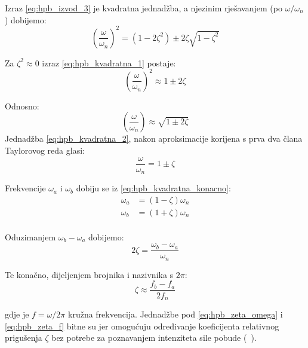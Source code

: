 Izraz \eqref{eq:hpb_izvod_3} je kvadratna jednadžba, a njezinim rješavanjem (po
$\omega/\omega_n$) dobijemo:
\begin{equation}\label{eq:hpb_kvadratna_1}
    \left(\frac{\omega}{\omega_n}\right)^2 = 
        (1-2\zeta^2)\pm 2\zeta\sqrt{1-\zeta^2}
\end{equation}

Za $\zeta^2 \approx 0$ izraz \eqref{eq:hpb_kvadratna_1} postaje:
\begin{equation}
    \left(\frac{\omega}{\omega_n}\right)^2 \approx
        1 \pm 2\zeta
\end{equation}

Odnosno:
\begin{equation}\label{eq:hpb_kvadratna_2}
    \left(\frac{\omega}{\omega_n}\right)\approx
        \sqrt{1 \pm 2\zeta}
\end{equation}
Jednadžba \eqref{eq:hpb_kvadratna_2}, nakon aproksimacije korijena s prva dva člana Taylorovog
reda glasi:
\begin{equation}\label{eq:hpb_kvadratna_konacno}
    \frac{\omega}{\omega_n} = 1 \pm \zeta
\end{equation}

Frekvencije $\omega_a$ i $\omega_b$ dobiju se iz \eqref{eq:hpb_kvadratna_konacno}:
\begin{align}
    \omega_a &= (1-\zeta)\omega_n\\
    \omega_b &= (1+\zeta)\omega_n\\
\end{align}

Oduzimanjem $\omega_b-\omega_a$ dobijemo:
\begin{equation}\label{eq:hpb_zeta_omega}
        2\zeta = \frac{\omega_b-\omega_a}{\omega_n}
\end{equation}

Te konačno, dijeljenjem brojnika i nazivnika s $2\pi$:
\begin{equation}\label{eq:hpb_zeta_f}
    \zeta\approx\frac{f_b-f_a}{2f_n}
\end{equation}

gdje je $f=\omega/2\pi$ kružna frekvencija. Jednadžbe pod \eqref{eq:hpb_zeta_omega}
i \eqref{eq:hpb_zeta_f} bitne su jer omogućuju određivanje koeficijenta relativnog prigušenja
$\zeta$ bez potrebe za poznavanjem intenziteta sile pobude (~\cite{chopra2011}). 


